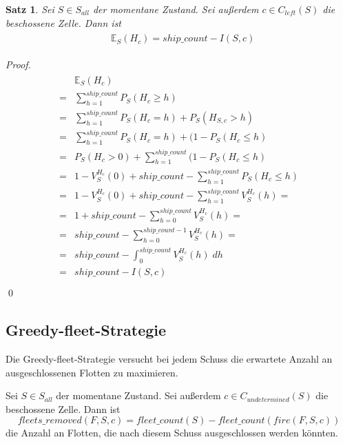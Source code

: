 \documentclass[a4paper,12pt]{llncs}
\numberwithin{equation}{section}
\newtheorem{satz}{Satz}
\begin{document}
\begin{satz}
Sei $S\in S_{all}$ der momentane Zustand.
Sei außerdem $c \in C_{left}(S)$ die beschossene Zelle.
Dann ist
\begin{align}
\begin{split}
&\mathds{E}_S(H_c)=ship\_count - I(S,c)
\end{split}
\end{align}
\end{satz}

\begin{proof}
\begin{align}
\begin{split}
&\mathds{E}_S(H_{c})\\
=&\sum_{h=1}^{ship\_count} P_S(H_{c} \geq h)\\
=&\sum_{h=1}^{ship\_count} P_S(H_{c}=h) + P_S(H_{S,c} > h)\\
=&\sum_{h=1}^{ship\_count} P_S(H_{c}=h) + (1 - P_S(H_{c} \leq h)\\
=&P_S(H_{c} > 0) + \sum_{h=1}^{ship\_count} (1 - P_S(H_{c} \leq h)\\
=&1 - V_S^{H_{c}}(0) + ship\_count - \sum_{h=1}^{ship\_count} P_S(H_{c} \leq h)\\
=&1 - V_S^{H_{c}}(0) + ship\_count - \sum_{h=1}^{ship\_count} V_S^{H_{c}}(h)=\\
=&1 + ship\_count - \sum_{h=0}^{ship\_count} V_S^{H_{c}}(h)=\\
=&ship\_count - \sum_{h=0}^{ship\_count - 1} V_S^{H_{c}}(h)=\\
=&ship\_count - \int_{0}^{ship\_count} V_S^{H_{c}}(h) \; dh\\
=&ship\_count - I(S,c)\\
\end{split}
\end{align}
\qed
\end{proof}

\subsection{Greedy-fleet-Strategie}
Die Greedy-fleet-Strategie versucht bei jedem Schuss die erwartete Anzahl an ausgeschlossenen Flotten zu maximieren.

\begin{definition}
Sei $S\in S_{all}$ der momentane Zustand.
Sei außerdem $c \in C_{undetermined}(S)$ die beschossene Zelle.
Dann ist
\[
fleets\_removed(F, S, c)=fleet\_count(S) - fleet\_count(fire(F, S,c))
\]
die Anzahl an Flotten, die nach diesem Schuss ausgeschlossen werden könnten.
\end{definition}
\end{document}
